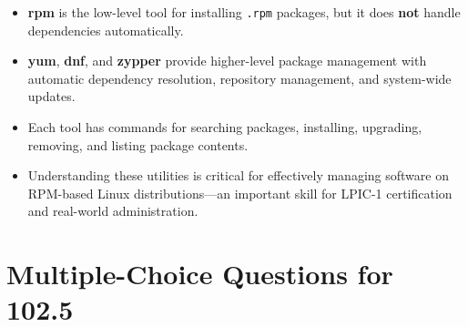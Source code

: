 \documentclass[a4paper]{report}
\begin{document}
\begin{itemize}
    \item \textbf{rpm} is the low-level tool for installing \texttt{.rpm} packages, but it does \textbf{not} handle dependencies automatically.
    \item \textbf{yum}, \textbf{dnf}, and \textbf{zypper} provide higher-level package management with automatic dependency resolution, repository management, and system-wide updates.
    \item Each tool has commands for searching packages, installing, upgrading, removing, and listing package contents.
    \item Understanding these utilities is critical for effectively managing software on RPM-based Linux distributions—an important skill for LPIC-1 certification and real-world administration.
\end{itemize}



\newpage
\section*{Multiple-Choice Questions for 102.5}
\end{document}
